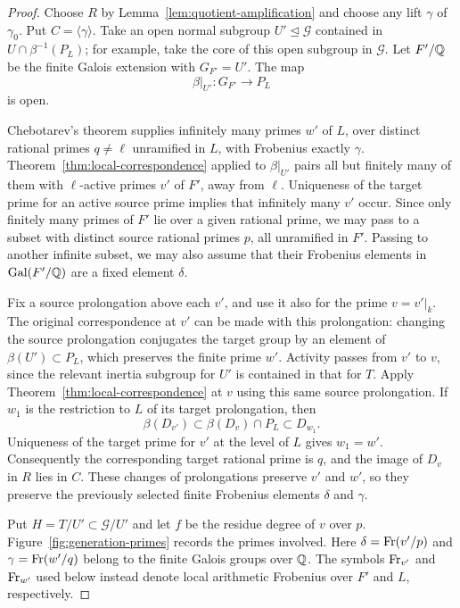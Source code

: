 \begin{proof}
Choose $R$ by Lemma~\ref{lem:quotient-amplification} and choose any
lift $\gamma$ of $\gamma_0$. Put $C=\langle\gamma\rangle$.
Take an open normal subgroup $U'\trianglelefteq\mathcal G$ contained
in $U\cap\beta^{-1}(P_L)$; for example, take the core of this open
subgroup in $\mathcal G$. Let $F'/\mathbb Q$ be the finite Galois extension
with $G_{F'}=U'$. The map
\[
 \beta|_{U'}:G_{F'}\longrightarrow P_L
\]
is open.

Chebotarev's theorem supplies infinitely many primes $w'$ of $L$,
over distinct rational primes $q\ne\ell$ unramified in $L$, with
Frobenius exactly $\gamma$. Theorem~\ref{thm:local-correspondence}
applied to $\beta|_{U'}$ pairs all but finitely many of them with
$\ell$-active primes $v'$ of $F'$, away from $\ell$.
Uniqueness of the target prime for an active source prime implies
that infinitely many $v'$ occur. Since only finitely many primes of
$F'$ lie over a given rational prime, we may pass to a subset with
distinct source rational primes $p$, all unramified in $F'$.
Passing to another infinite subset, we may also assume that their
Frobenius elements in $\operatorname{Gal}(F'/\mathbb Q)$ are a fixed element $\delta$.

Fix a source prolongation above each $v'$, and use it also for the
prime $v=v'|_k$. The original correspondence at $v'$ can be made
with this prolongation: changing the source prolongation conjugates
the target group by an element of $\beta(U')\subset P_L$, which
preserves the finite prime $w'$. Activity passes from $v'$ to $v$,
since the relevant inertia subgroup for $U'$ is contained in that
for $T$. Apply Theorem~\ref{thm:local-correspondence} at $v$ using
this same source prolongation. If $w_1$ is the restriction to $L$
of its target prolongation, then
\[
 \beta(D_{v'})\subset\beta(D_v)\cap P_L\subset D_{w_1}.
\]
Uniqueness of the target prime for $v'$ at the level of $L$ gives
$w_1=w'$. Consequently the corresponding target rational prime
is $q$, and the image of $D_v$ in $R$ lies in $C$.
These changes of prolongations preserve $v'$ and $w'$, so they
preserve the previously selected finite Frobenius elements
$\delta$ and $\gamma$.

Put $H=T/U'\subset\mathcal G/U'$ and let $f$ be the residue degree
of $v$ over $p$. Figure~\ref{fig:generation-primes} records the
primes involved. Here $\delta=\operatorname{Fr}(v'/p)$ and
$\gamma=\operatorname{Fr}(w'/q)$ belong to the finite Galois groups over $\mathbb Q$.
The symbols $\operatorname{Fr}_{v'}$ and $\operatorname{Fr}_{w'}$ used below instead denote
local arithmetic Frobenius over $F'$ and $L$, respectively.


\end{proof}
